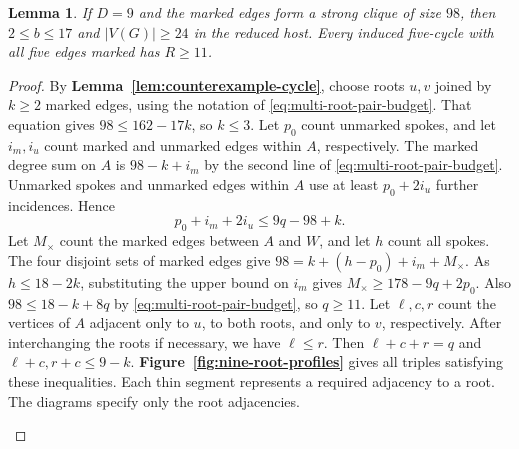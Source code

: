 \documentclass[preprint,11pt,numbers]{elsarticle-arxiv}
\numberwithin{equation}{section}
\newtheorem{lemma}[theorem]{Lemma}
\theoremstyle{definition}
\begin{document}
\begin{lemma}\label{lem:finite-nine}
If $D=9$ and the marked edges form a strong clique of size $98$, then
$2\leq b\leq17$ and $|V(G)|\geq24$ in the reduced host. Every induced
five-cycle with all five edges marked has $R\geq11$.
\end{lemma}

\begin{proof}
By \textbf{Lemma~\ref{lem:counterexample-cycle}}, choose roots
$u,v$ joined by $k\ge2$ marked edges, using the notation of
\eqref{eq:multi-root-pair-budget}. That equation gives
$98\le162-17k$, so $k\le3$. Let $p_0$ count unmarked spokes,
and let $i_m,i_u$ count marked and unmarked edges within $A$,
respectively. The marked degree sum on $A$ is $98-k+i_m$ by
the second line of \eqref{eq:multi-root-pair-budget}. Unmarked
spokes and unmarked edges within $A$ use at least $p_0+2i_u$
further incidences. Hence
\[
 p_0+i_m+2i_u\leq 9q-98+k .
\]
Let $M_\times$ count the marked edges between $A$ and $W$, and
let $h$ count all spokes. The four disjoint sets of marked edges
give $98=k+(h-p_0)+i_m+M_\times$. As $h\le18-2k$,
substituting the upper bound on $i_m$ gives
$M_\times\ge178-9q+2p_0$. Also
$98\le18-k+8q$ by \eqref{eq:multi-root-pair-budget}, so
$q\ge11$. Let $\ell,c,r$ count the vertices of $A$ adjacent
only to $u$, to both roots, and only to $v$, respectively.
After interchanging the roots if necessary, we have
$\ell\le r$. Then $\ell+c+r=q$ and $\ell+c,r+c\le9-k$.
\textbf{Figure~\ref{fig:nine-root-profiles}} gives all triples
satisfying these inequalities. Each thin segment represents
a required adjacency to a root. The diagrams specify only
the root adjacencies.
\begin{figure}[!htbp]
\centering
\begingroup
\newcommand{\nineRoot}[4]{%
\begin{tikzpicture}[x=1mm,y=1mm,baseline=0mm]
  \path[use as bounding box] (-12,-5.4) rectangle (12,4.3);
  \draw[marked edge,line width=1pt] (-2,1.4)--(2,1.4);
  \foreach \j in {1,...,#1}{
    \pgfmathsetmacro{\fy}{4.8*(\j-(#1+1)/2)/(#1-1)+1.4}
    \draw[black!65,line width=.35pt] (-2,1.4)--(-8,\fy);
    \fill (-8,\fy) circle[radius=.25mm];}
  \foreach \j in {1,...,#3}{
    \pgfmathsetmacro{\fy}{4.8*(\j-(#3+1)/2)/(#3-1)+1.4}
    \draw[black!65,line width=.35pt] (2,1.4)--(8,\fy);
    \fill (8,\fy) circle[radius=.25mm];}
  \ifnum#2>0
    \foreach \j in {1,...,#2}{
      \pgfmathsetmacro{\fx}{1.8*(\j-(#2+1)/2)}
      \draw[black!65,line width=.35pt] (-2,1.4)--(\fx,-1.9)--(2,1.4);
      \fill (\fx,-1.9) circle[radius=.25mm];}

\end{tikzpicture}}
\end{figure}
\end{proof}
\end{document}
